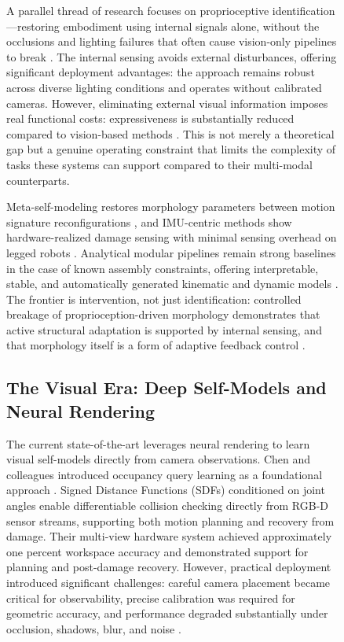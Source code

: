 \documentclass[12pt,a4paper,oneside]{report}
\begin{document}
\begin{figure}[H]
A parallel thread of research focuses on proprioceptive identification---restoring embodiment using internal signals alone, without the occlusions and lighting failures that often cause vision-only pipelines to break \cite{hu2024reconfigurable}. The internal sensing avoids external disturbances, offering significant deployment advantages: the approach remains robust across diverse lighting conditions and operates without calibrated cameras. However, eliminating external visual information imposes real functional costs: expressiveness is substantially reduced compared to vision-based methods \cite{farghdani2025robust}. This is not merely a theoretical gap but a genuine operating constraint that limits the complexity of tasks these systems can support compared to their multi-modal counterparts.

Meta-self-modeling restores morphology parameters between motion signature reconfigurations \cite{hu2024reconfigurable}, and IMU-centric methods show hardware-realized damage sensing with minimal sensing overhead on legged robots \cite{farghdani2025robust}. Analytical modular pipelines remain strong baselines in the case of known assembly constraints, offering interpretable, stable, and automatically generated kinematic and dynamic models \cite{dogra2022unified}. The frontier is intervention, not just identification: controlled breakage of proprioception-driven morphology demonstrates that active structural adaptation is supported by internal sensing, and that morphology itself is a form of adaptive feedback control \cite{xu2026antenna, yu2026kinematicself}.

\subsection{The Visual Era: Deep Self-Models and Neural Rendering}
\label{subsec:visual_era}

The current state-of-the-art leverages neural rendering to learn visual self-models directly from camera observations. Chen and colleagues introduced occupancy query learning as a foundational approach \cite{chen2022full}. Signed Distance Functions (SDFs) conditioned on joint angles enable differentiable collision checking directly from RGB-D sensor streams, supporting both motion planning and recovery from damage. Their multi-view hardware system achieved approximately one percent workspace accuracy and demonstrated support for planning and post-damage recovery. However, practical deployment introduced significant challenges: careful camera placement became critical for observability, precise calibration was required for geometric accuracy, and performance degraded substantially under occlusion, shadows, blur, and noise \cite{chen2022full}.


\end{figure}
\end{document}
